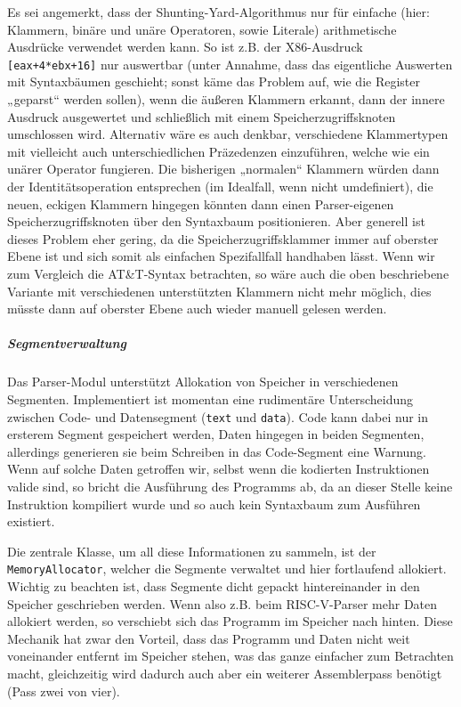 Es sei angemerkt, dass der Shunting-Yard-Algorithmus nur für einfache (hier:
Klammern, binäre und unäre Operatoren, sowie Literale) arithmetische Ausdrücke
verwendet werden kann. So ist z.B. der X86-Ausdruck \texttt{[eax+4*ebx+16]} nur
auswertbar (unter Annahme, dass das eigentliche Auswerten mit Syntaxbäumen
geschieht; sonst käme das Problem auf, wie die Register „geparst“ werden
sollen), wenn die äußeren Klammern erkannt, dann der innere Ausdruck ausgewertet
und schließlich mit einem Speicherzugriffsknoten umschlossen wird. Alternativ
wäre es auch denkbar, verschiedene Klammertypen mit vielleicht auch
unterschiedlichen Präzedenzen einzuführen, welche wie ein unärer Operator
fungieren. Die bisherigen „normalen“ Klammern würden dann der
Identitätsoperation entsprechen (im Idealfall, wenn nicht umdefiniert), die
neuen, eckigen Klammern hingegen könnten dann einen Parser-eigenen
Speicherzugriffsknoten über den Syntaxbaum positionieren. Aber generell ist
dieses Problem eher gering, da die Speicherzugriffsklammer immer auf oberster
Ebene ist und sich somit als einfachen Spezifallfall handhaben lässt. Wenn wir
zum Vergleich die AT\&T-Syntax betrachten, so wäre auch die oben beschriebene
Variante mit verschiedenen unterstützten Klammern nicht mehr möglich, dies
müsste dann auf oberster Ebene auch wieder manuell gelesen werden.

\subparagraph{Segmentverwaltung}

Das Parser-Modul unterstützt Allokation von Speicher in verschiedenen Segmenten.
Implementiert ist momentan eine rudimentäre Unterscheidung zwischen Code- und
Datensegment (\texttt{text} und \texttt{data}). Code kann dabei nur in ersterem
Segment gespeichert werden, Daten hingegen in beiden Segmenten, allerdings
generieren sie beim Schreiben in das Code-Segment eine Warnung. Wenn auf solche
Daten getroffen wir, selbst wenn die kodierten Instruktionen valide sind, so
bricht die Ausführung des Programms ab, da an dieser Stelle keine Instruktion
kompiliert wurde und so auch kein Syntaxbaum zum Ausführen existiert.

Die zentrale Klasse, um all diese Informationen zu sammeln, ist der
\texttt{MemoryAllocator}, welcher die Segmente verwaltet und hier fortlaufend
allokiert. Wichtig zu beachten ist, dass Segmente dicht gepackt hintereinander
in den Speicher geschrieben werden. Wenn also z.B. beim RISC-V-Parser mehr Daten
allokiert werden, so verschiebt sich das Programm im Speicher nach hinten. Diese
Mechanik hat zwar den Vorteil, dass das Programm und Daten nicht weit
voneinander entfernt im Speicher stehen, was das ganze einfacher zum Betrachten
macht, gleichzeitig wird dadurch auch aber ein weiterer Assemblerpass benötigt
(Pass zwei von vier).

